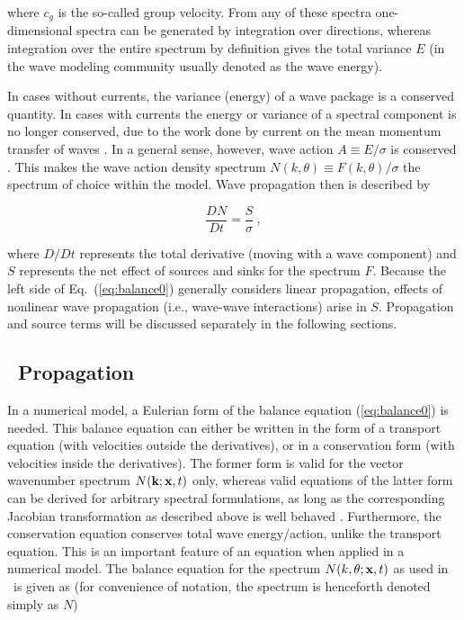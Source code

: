 \noindent
where $c_g$ is the so-called group velocity.  From any of these spectra
one-dimensional spectra can be generated by integration over directions,
whereas integration over the entire spectrum by definition gives the total
variance $E$ (in the wave modeling community usually denoted as the wave
energy).

In cases without currents, the variance (energy) of a wave package is a
conserved quantity. In cases with currents the energy or variance of a
spectral component is no longer conserved, due to the work done by current on
the mean momentum transfer of waves \citep{art:LHS61,art:LHS62}. In a general
sense, however, wave action $A \equiv E/\sigma$ is conserved
\citep[e.g.,][]{art:Whi65,art:BG68}. This makes the wave action density
spectrum $N(k,\theta) \equiv F(k,\theta)/\sigma$ the spectrum of choice within
the model. Wave propagation then is described by


\begin{equation}
\frac{D N}{D t} = \frac{S}{\sigma} \: ,
\label{eq:balance0}
\end{equation}

\noindent
where $D/Dt$ represents the total derivative (moving with a wave component)
and $S$ represents the net effect of sources and sinks for the spectrum
$F$. Because the left side of Eq.~(\ref{eq:balance0}) generally considers
linear propagation, effects of nonlinear wave propagation (i.e., wave-wave
interactions) arise in $S$. Propagation and source terms will be discussed
separately in the following sections.

\vssub
\subsection{~Propagation}
\vssub

In a numerical model, a Eulerian form of the balance equation
(\ref{eq:balance0}) is needed. This balance equation can either be written in
the form of a transport equation (with velocities outside the derivatives), or
in a conservation form (with velocities inside the derivatives). The former
form is valid for the vector wavenumber spectrum $N(\mbox{\bf k};\mbox{\bf x},t)$ only, whereas
valid equations of the latter form can be derived for arbitrary spectral
formulations, as long as the corresponding Jacobian transformation as
described above is well behaved \citep[e.g.,][]{tol:GAOS98b}. Furthermore, the
conservation equation conserves total wave energy/action, unlike the transport
equation. This is an important feature of an equation when applied in a
numerical model. The balance equation for the spectrum $N(k,\theta;\mbox{\bf x},t)$ as
used in \ws\ is given as (for convenience of notation, the spectrum is
henceforth denoted simply as $N$)

